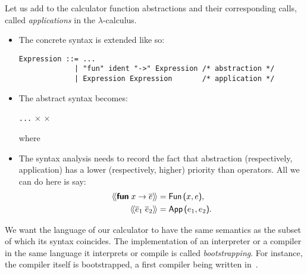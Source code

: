 Let us add to the calculator function abstractions and their
corresponding calls, called \emph{applications} in the
\(\lambda\)-calculus.
\begin{itemize}

  \item The concrete syntax is extended like so:
\begin{verbatim}
Expression ::= ... 
             | "fun" ident "->" Expression /* abstraction */
             | Expression Expression       /* application */
\end{verbatim}

  \item The abstract syntax becomes:

  \noindent \Xtype {} \equal \texttt{...} \vbar {}
  \Xof {} \(\times\)  \vbar {}
  \Xof {} \(\times\) 

  \noindent where

  \item The syntax analysis needs to record the fact that abstraction
    (respectively, application) has a lower (respectively, higher)
    priority than operators. All we can do here is say:
\begin{align*}
\src{\Xfun \; x \rightarrow \meta{e}}
  &= \cst{Fun} \, \lpar{x}, e\rpar,\\
\src{\meta{e}_1 \; \meta{e}_2}
  &= \cst{App} \, \lpar e_1, e_2\rpar.
\end{align*}

\end{itemize}
We want the language of our calculator to have the same semantics as
the subset of \OCaml which its syntax coincides. The implementation of
an interpreter or a compiler in the same language it interprets or
compile is called \emph{bootstrapping}. For instance, the \OCaml
compiler itself is bootstrapped, a first compiler being written
in~\Clang.

